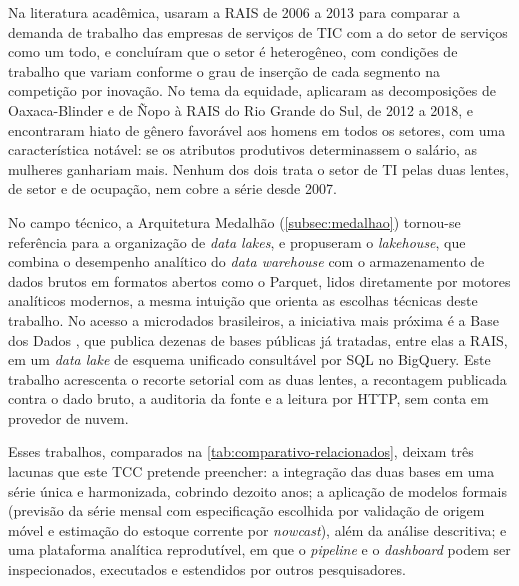 Na literatura acadêmica,  usaram a RAIS de 2006 a 2013 para comparar a demanda de trabalho das empresas de serviços de TIC com a do setor de serviços como um todo, e concluíram que o setor é heterogêneo, com condições de trabalho que variam conforme o grau de inserção de cada segmento na competição por inovação. No tema da equidade,  aplicaram as decomposições de Oaxaca-Blinder e de Ñopo à RAIS do Rio Grande do Sul, de 2012 a 2018, e encontraram hiato de gênero favorável aos homens em todos os setores, com uma característica notável: se os atributos produtivos determinassem o salário, as mulheres ganhariam mais. Nenhum dos dois trata o setor de TI pelas duas lentes, de setor e de ocupação, nem cobre a série desde 2007.

No campo técnico, a Arquitetura Medalhão (\autoref{subsec:medalhao}) tornou-se referência para a organização de \textit{data lakes}, e  propuseram o \textit{lakehouse}, que combina o desempenho analítico do \textit{data warehouse} com o armazenamento de dados brutos em formatos abertos como o Parquet, lidos diretamente por motores analíticos modernos, a mesma intuição que orienta as escolhas técnicas deste trabalho. No acesso a microdados brasileiros, a iniciativa mais próxima é a Base dos Dados \cite{Dahis2022}, que publica dezenas de bases públicas já tratadas, entre elas a RAIS, em um \textit{data lake} de esquema unificado consultável por SQL no BigQuery. Este trabalho acrescenta o recorte setorial com as duas lentes, a recontagem publicada contra o dado bruto, a auditoria da fonte e a leitura por HTTP, sem conta em provedor de nuvem.

Esses trabalhos, comparados na \autoref{tab:comparativo-relacionados}, deixam três lacunas que este TCC pretende preencher: a integração das duas bases em uma série única e harmonizada, cobrindo dezoito anos; a aplicação de modelos formais (previsão da série mensal com especificação escolhida por validação de origem móvel e estimação do estoque corrente por \textit{nowcast}), além da análise descritiva; e uma plataforma analítica reprodutível, em que o \textit{pipeline} e o \textit{dashboard} podem ser inspecionados, executados e estendidos por outros pesquisadores.
